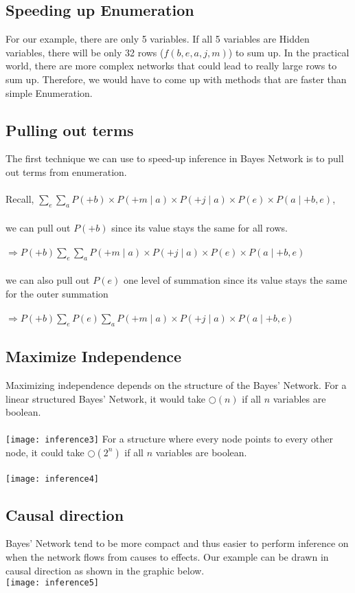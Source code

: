 \documentclass[12pt]{article}
\begin{document}
\subsection{Speeding up Enumeration}
For our example, there are only 5 variables. If all 5 variables are Hidden variables, there will be only 32 rows (\(f(b, e, a, j, m)\)) to sum up. In the practical world, there are more complex networks that could lead to really large rows to sum up. Therefore, we would have to come up with methods that are faster than simple Enumeration.
\subsection{Pulling out terms}
The first technique we can use to speed-up inference in Bayes Network is to pull out terms from enumeration.\\\\
Recall, \(\sum_{e}\sum_{a}P(+b) \times P(+m \mid a) \times P(+j \mid a) \times P(e) \times P(a \mid +b, e)\),\\\\
we can pull out \(P(+b)\) since its value stays the same for all rows.\\\\
\(\Rightarrow P(+b) \sum_{e}\sum_{a} P(+m \mid a) \times P(+j \mid a) \times P(e) \times P(a \mid +b, e)\)\\\\
we can also pull out \(P(e)\) one level of summation since its value stays the same for the outer summation\\\\
\(\Rightarrow P(+b) \sum_{e} P(e)  \sum_{a} P(+m \mid a) \times P(+j \mid a) \times P(a \mid +b, e)\)\\
\subsection{Maximize Independence}
Maximizing independence depends on the structure of the Bayes' Network. For a linear structured Bayes' Network, it would take \(\bigcirc(n)\) if all \(n\) variables are boolean.\\\\
\vspace{2em}
\texttt{[image: inference3]}
For a structure where every node points to every other node, it could take \(\bigcirc(2^{n})\) if all \(n\) variables are boolean.\\\\
\vspace{2em}
\texttt{[image: inference4]}
\subsection{Causal direction}
Bayes' Network tend to be more compact and thus easier to perform inference on when the network flows from causes to effects. Our example can be drawn in causal direction as shown in the graphic below.\\
\texttt{[image: inference5]}
\end{document}

